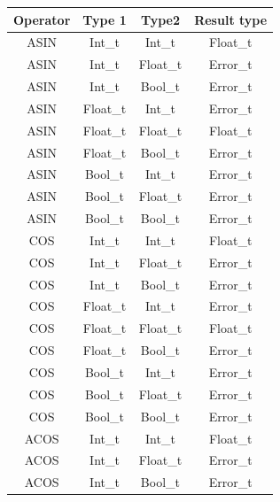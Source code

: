 \begin{figure}[H]
    \centering
    \begin{tabular}{cccc}
        \toprule
        \textbf{Operator} & \textbf{Type 1} & \textbf{Type2} & \textbf{Result type}\\
        \midrule ASIN & Int\_t & Int\_t      & Float\_t \\
        \midrule ASIN & Int\_t & Float\_t    & Error\_t \\
        \midrule ASIN & Int\_t & Bool\_t     & Error\_t \\

        \midrule ASIN & Float\_t & Int\_t    & Error\_t \\
        \midrule ASIN & Float\_t & Float\_t  & Float\_t \\
        \midrule ASIN & Float\_t & Bool\_t   & Error\_t \\

        \midrule ASIN & Bool\_t & Int\_t     & Error\_t \\
        \midrule ASIN & Bool\_t & Float\_t   & Error\_t \\
        \midrule ASIN & Bool\_t & Bool\_t    & Error\_t \\

        \midrule COS & Int\_t & Int\_t      & Float\_t \\
        \midrule COS & Int\_t & Float\_t    & Error\_t \\
        \midrule COS & Int\_t & Bool\_t     & Error\_t \\

        \midrule COS & Float\_t & Int\_t    & Error\_t \\
        \midrule COS & Float\_t & Float\_t  & Float\_t \\
        \midrule COS & Float\_t & Bool\_t   & Error\_t \\

        \midrule COS & Bool\_t & Int\_t     & Error\_t \\
        \midrule COS & Bool\_t & Float\_t   & Error\_t \\
        \midrule COS & Bool\_t & Bool\_t    & Error\_t \\

        \midrule ACOS & Int\_t & Int\_t      & Float\_t \\
        \midrule ACOS & Int\_t & Float\_t    & Error\_t \\
        \midrule ACOS & Int\_t & Bool\_t     & Error\_t \\


\end{tabular}
\end{figure}
